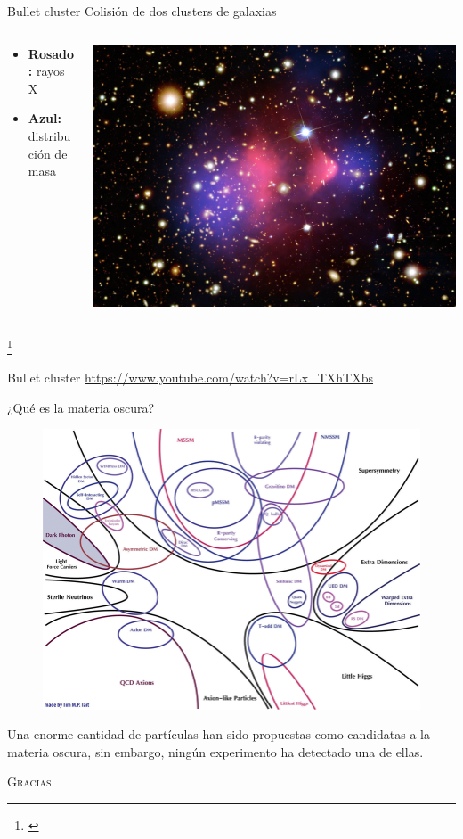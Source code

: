 \documentclass[handout]{beamer}
\newcommand\blfootnote[1]
{%
	\begingroup
	\renewcommand\thefootnote{}\footnote{#1}%
	\addtocounter{footnote}{-1}%
	\endgroup
}
\newcommand{\fcite}[1]{\blfootnote{\cite{#1}}}
\begin{document}
\begin{frame}{Bullet cluster}
	Colisión de dos clusters de galaxias
	\begin{columns}
		\begin{column}{0.4\textwidth}
			\begin{itemize}\small
				\item \textbf{Rosado:} rayos X
				\item \textbf{Azul:} distribución de masa
			\end{itemize}
		\end{column}
		\begin{column}{0.6\textwidth}
			\includegraphics[width = \linewidth]{sources/images/bullet}
		\end{column}
	\end{columns}
	\fcite{brownstein2007bullet}
\end{frame}

\begin{frame}{Bullet cluster}
	\vspace{1cm}
	{\footnotesize
		\url{https://www.youtube.com/watch?v=rLx_TXhTXbs}
	}
\end{frame}

\begin{frame}{¿Qué es la materia oscura?}\small
	\begin{figure}[h]
		\centering
		\includegraphics[width = 0.7\linewidth]{sources/images/candidates}
	\end{figure}
	
	Una enorme cantidad de partículas han sido propuestas como candidatas a la materia oscura, sin embargo, ningún experimento ha detectado una de ellas. 
\end{frame}

\begin{frame}
	\centering
	\scshape
	\Huge
	Gracias
\end{frame}
\end{document}
